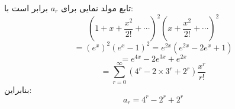         \p
تابع مولد نمایی برای
$a_r$
برابر است با:
$$(1 + x + \frac{x^2}{2!} + \cdots)^2(x + \frac{x^2}{2!} + \cdots)^2$$
$$= (e^x)^2(e^x-1)^2 = e^{2x}(e^{2x}-2e^x + 1)$$
$$= e^{4x} - 2e^{3x} + e^{2x}$$
$$= \sum_{r=0}^{\infty}(4^r - 2 \times 3^r + 2^r)\frac{x^r}{r!}$$
بنابراین:
$$a_r = 4^r - 2^r + 2^r$$